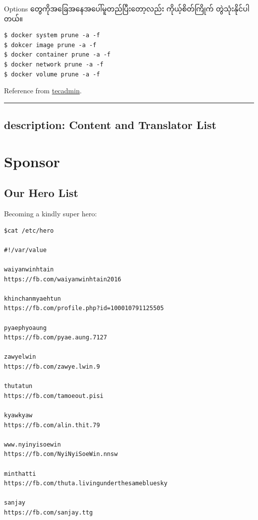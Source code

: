 \documentclass{article}
\begin{document}
Options တွေကိုအခြေအနေအပေါ်မူတည်ပြီးတော့လည်း ကိုယ့်စိတ်ကြိုက်
တွဲသုံးနိုင်ပါတယ်။

\begin{verbatim}
$ docker system prune -a -f
$ dokcer image prune -a -f
$ docker container prune -a -f
$ docker network prune -a -f
$ docker volume prune -a -f
\end{verbatim}

Reference from
\href{https://tecadmin.net/tutorial/docker/docker-prune-unused-objects/}{tecadmin}.

\begin{center}\rule{3in}{0.4pt}\end{center}

\subsection{description: Content and Translator
List}\label{description-content-and-translator-list}


\pagebreak

\section{Sponsor}\label{sponsor}

\subsection{Our Hero List}\label{our-hero-list}

Becoming a kindly super hero:

\begin{verbatim}
$cat /etc/hero

#!/var/value

waiyanwinhtain 
https://fb.com/waiyanwinhtain2016

khinchanmyaehtun
https://fb.com/profile.php?id=100010791125505

pyaephyoaung 
https://fb.com/pyae.aung.7127

zawyelwin    
https://fb.com/zawye.lwin.9

thutatun    
https://fb.com/tamoeout.pisi

kyawkyaw    
https://fb.com/alin.thit.79

www.nyinyisoewin
https://fb.com/NyiNyiSoeWin.nnsw

minthatti
https://fb.com/thuta.livingunderthesamebluesky

sanjay
https://fb.com/sanjay.ttg
\end{verbatim}
\end{document}
